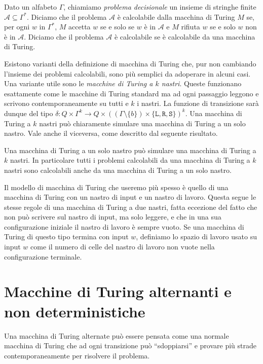 \begin{definizione}
\label{def:problem}
 Dato un alfabeto $\Gamma$, chiamiamo \emph{problema decisionale} un insieme di stringhe finite
 $\mathcal{A} \subseteq \Gamma^\ast$. Diciamo che il problema $\mathcal{A}$ è calcolabile dalla macchina
 di Turing $M$ se, per ogni $w$ in $\Gamma^\ast$, $M$ accetta $w$ se e solo se $w$
 è in $\mathcal{A}$ e $M$ rifiuta $w$ se e solo $w$ non è in $\mathcal{A}$.
 Diciamo che il problema $\mathcal{A}$ è calcolabile se è calcolabile da una
 macchina di Turing.
\end{definizione}

Esistono varianti della definizione di macchina di Turing che, pur non cambiando
l'insieme dei problemi calcolabili, sono più semplici da adoperare in alcuni
casi. Una variante utile sono le
\emph{macchine di Turing a $k$ nastri}. Queste funzionano esattamente come le
macchine di Turing standard ma ad ogni passaggio leggono e scrivono contemporaneamente su
tutti e $k$ i nastri. La funzione di transizione sarà dunque del tipo
$\delta:  Q \times \Gamma^k \to Q \times ((\Gamma \setminus \{b\}) \times \{\texttt{L},\texttt{R},\texttt{S}\})^k$.
Una macchina di Turing a $k$ nastri può chiaramente simulare una macchina di Turing
a un solo nastro. Vale anche il viceversa, come descritto dal seguente risultato.

\begin{fatto}
Una macchina di Turing a un solo nastro può simulare una macchina di Turing
a $k$ nastri.
In particolare tutti i problemi calcolabili da una macchina
di Turing a $k$ nastri sono calcolabili anche da una macchina di Turing a un solo nastro.
\end{fatto}

Il modello di macchina di Turing che useremo più spesso è quello di una macchina di Turing
con un nastro di input e un nastro di lavoro. Questa segue le stesse regole di
una macchina di Turing a due nastri, fatta eccezione del fatto che non può scrivere
sul nastro di input, ma solo leggere, e che in una sua configurazione iniziale
il nastro di lavoro è sempre vuoto. Se una macchina di Turing di questo tipo
termina con input $w$, definiamo lo spazio di lavoro usato su input $w$
come il numero di celle del nastro di lavoro non vuote nella configurazione terminale.


\section{Macchine di Turing alternanti e non deterministiche}
Una macchina di Turing alternate può essere pensata come una normale macchina di
Turing che ad ogni transizione può ``sdoppiarsi'' e provare più strade contemporaneamente
per risolvere il problema.

